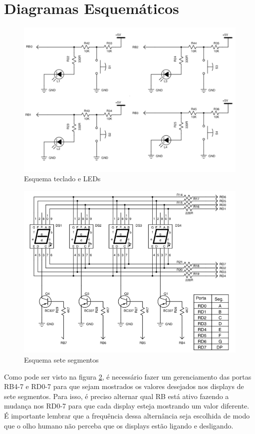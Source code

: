 \documentclass{article}
\begin{document}
\section{Diagramas Esquemáticos}

\begin{figure}[H]
	\centering
	\includegraphics[width=0.7\linewidth]{esq_ledswi}
	\caption{Esquema teclado e LEDs}
	\label{fig:esq_ledswi}
\end{figure}
\begin{figure}[H]
	\centering
	\includegraphics[width=0.9\linewidth]{esq_7seg}
	\caption{Esquema sete segmentos}
	\label{fig:esq_7seg}
\end{figure}
Como pode ser visto na figura \ref{fig:esq_7seg}, é necessário fazer um gerenciamento das portas RB4-7 e RD0-7 para que sejam mostrados os valores desejados nos displays de sete segmentos. Para isso, é preciso alternar qual RB está ativo fazendo a mudança nos RD0-7 para que cada display esteja mostrando um valor diferente. É importante lembrar que a frequência dessa alternância seja escolhida de modo que o olho humano não perceba que os displays estão ligando e desligando.
\end{document}
